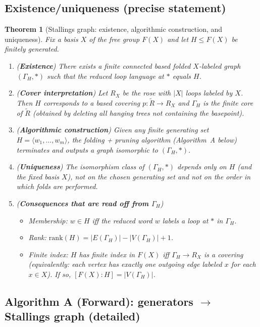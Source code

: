 \documentclass[11pt]{article}
\newtheorem{theorem}{Theorem}[section]
\theoremstyle{definition}
\theoremstyle{plain}
\theoremstyle{remark}
\begin{document}
\subsection*{Existence/uniqueness (precise statement)}
\begin{theorem}[Stallings graph: existence, algorithmic construction, and uniqueness]\label{thm:stallings}
Fix a basis $X$ of the free group $F(X)$ and let $H\le F(X)$ be finitely generated.
\begin{enumerate}[leftmargin=2.2em]
\item (\textbf{Existence}) There exists a finite connected based folded $X$-labeled graph $(\Gamma_H,*)$
such that the reduced loop language at $*$ equals $H$.

\item (\textbf{Cover interpretation}) Let $R_X$ be the rose with $|X|$ loops labeled by $X$.
Then $H$ corresponds to a based covering $p:\widetilde R\to R_X$ and $\Gamma_H$ is the \emph{finite core} of $\widetilde R$
(obtained by deleting all hanging trees not containing the basepoint).

\item (\textbf{Algorithmic construction}) Given any finite generating set $H=\langle w_1,\dots,w_m\rangle$,
the \emph{folding + pruning} algorithm (Algorithm~A below) terminates and outputs a graph isomorphic to $(\Gamma_H,*)$.

\item (\textbf{Uniqueness}) The isomorphism class of $(\Gamma_H,*)$ depends only on $H$ (and the fixed basis $X$),
not on the chosen generating set and not on the order in which folds are performed.

\item (\textbf{Consequences that are read off from $\Gamma_H$})
\begin{itemize}[leftmargin=2em]
\item Membership: $w\in H$ iff the reduced word $w$ labels a loop at $*$ in $\Gamma_H$.
\item Rank: $\mathrm{rank}(H)=|E(\Gamma_H)|-|V(\Gamma_H)|+1$.
\item Finite index: $H$ has finite index in $F(X)$ iff $\Gamma_H\to R_X$ is a covering (equivalently: each vertex has exactly one outgoing edge labeled $x$ for each $x\in X$).
If so, $[F(X):H]=|V(\Gamma_H)|$.
\end{itemize}
\end{enumerate}
\end{theorem}

\subsection*{Algorithm A (Forward): generators $\to$ Stallings graph (detailed)}\cite{stallings1983,kapovichmyasnikov2002,touikan2006}
\end{document}
